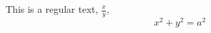 \documentclass[preview]{standalone}
\begin{document}
\begin{center}
This is a regular text,
            $\displaystyle\frac{x}{y}$,
            $$x^2+y^2=a^2$$
\end{center}
\end{document}

